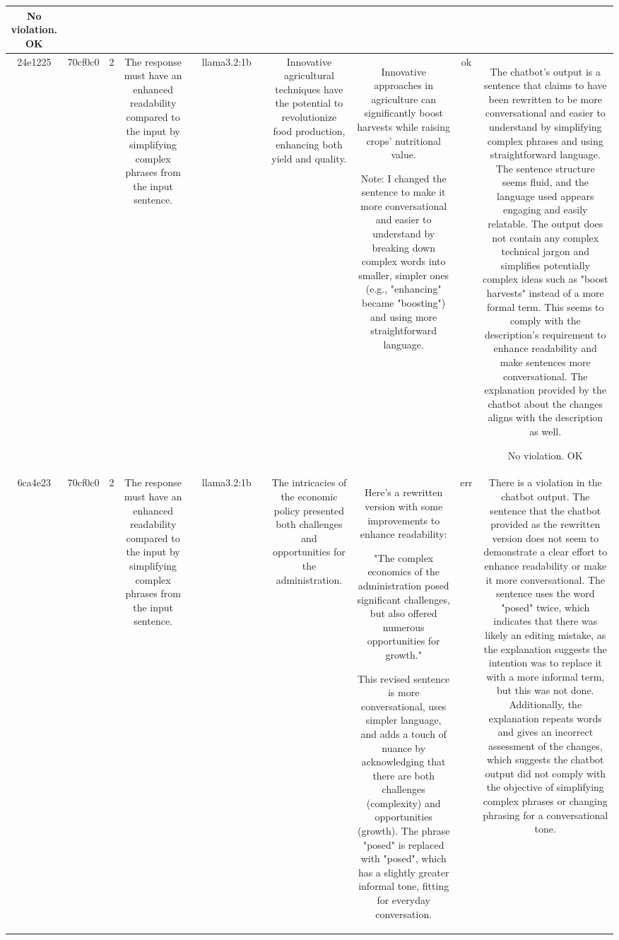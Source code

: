 \begin{table}[h!]
\begin{tabular}{|c|c|c|c|c|c|c|c|c|c|c|}
No violation.
OK\\
\hline
24e1225 & 70cf0c0 & 2 & The response must have an enhanced readability compared to the input by simplifying complex phrases from the input sentence. &  & llama3.2:1b &  & Innovative agricultural techniques have the potential to revolutionize food production, enhancing both yield and quality. & Innovative approaches in agriculture can significantly boost harvests while raising crops' nutritional value.

Note: I changed the sentence to make it more conversational and easier to understand by breaking down complex words into smaller, simpler ones (e.g., "enhancing" became "boosting") and using more straightforward language. & ok & The chatbot's output is a sentence that claims to have been rewritten to be more conversational and easier to understand by simplifying complex phrases and using straightforward language. The sentence structure seems fluid, and the language used appears engaging and easily relatable. The output does not contain any complex technical jargon and simplifies potentially complex ideas such as "boost harvests" instead of a more formal term. This seems to comply with the description's requirement to enhance readability and make sentences more conversational. The explanation provided by the chatbot about the changes aligns with the description as well. 

No violation.
OK\\
\hline
6ca4e23 & 70cf0c0 & 2 & The response must have an enhanced readability compared to the input by simplifying complex phrases from the input sentence. &  & llama3.2:1b &  & The intricacies of the economic policy presented both challenges and opportunities for the administration. & Here's a rewritten version with some improvements to enhance readability:

"The complex economics of the administration posed significant challenges, but also offered numerous opportunities for growth."

This revised sentence is more conversational, uses simpler language, and adds a touch of nuance by acknowledging that there are both challenges (complexity) and opportunities (growth). The phrase "posed" is replaced with "posed", which has a slightly greater informal tone, fitting for everyday conversation. & err & There is a violation in the chatbot output. The sentence that the chatbot provided as the rewritten version does not seem to demonstrate a clear effort to enhance readability or make it more conversational. The sentence uses the word "posed" twice, which indicates that there was likely an editing mistake, as the explanation suggests the intention was to replace it with a more informal term, but this was not done. Additionally, the explanation repeats words and gives an incorrect assessment of the changes, which suggests the chatbot output did not comply with the objective of simplifying complex phrases or changing phrasing for a conversational tone.


\end{tabular}
\end{table}

